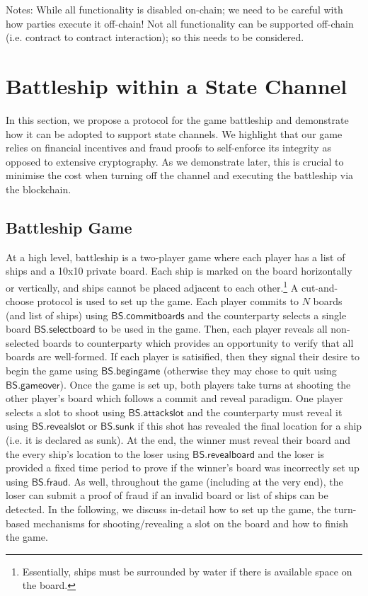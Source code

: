 \documentclass{llncs}
\newcommand{\battleshipfraud}{\mathsf{BS.fraud}}
\newcommand{\battleshipattackslot}{\mathsf{BS.attackslot}}
\newcommand{\battleshipbegin}{\mathsf{BS.begingame}}
\newcommand{\battleshipcommit}{\mathsf{BS.commitboards}}
\newcommand{\battleshipselectboard}{\mathsf{BS.selectboard}}
\newcommand{\battleshiprevealslot}{\mathsf{BS.revealslot}}
\newcommand{\battleshipsinking}{\mathsf{BS.sunk}}
\newcommand{\battleshiprevealboard}{\mathsf{BS.revealboard}}
\newcommand{\battleshipgameover}{\mathsf{BS.gameover}}
\begin{document}
Notes: While all functionality is disabled on-chain; we need to be careful with how parties execute it off-chain! Not all functionality can be supported off-chain (i.e. contract to contract interaction); so this needs to be considered. 

\section{Battleship within a State Channel} 

In this section, we propose a protocol for the game battleship and demonstrate how it can be adopted to support state channels. 
We highlight that our game relies on financial incentives and fraud proofs to self-enforce its integrity as opposed to extensive cryptography.
As we demonstrate later, this is crucial to minimise the cost when turning off the channel and executing the battleship via the blockchain. 

\subsection{Battleship Game} 

At a high level, battleship is a two-player game where each player has a list of ships and a 10x10 private board. 
Each ship is marked on the board horizontally or vertically, and ships cannot be placed adjacent to each other.\footnote{Essentially, ships must be surrounded by water if there is available space on the board.} 
A cut-and-choose protocol is used to set up the game. 
Each player commits to $N$ boards (and list of ships) using $\battleshipcommit$ and the counterparty selects a single board $\battleshipselectboard$ to be used in the game. 
Then, each player reveals all non-selected boards to counterparty which provides an opportunity to verify that all boards are well-formed.
If each player is satisified, then they signal their desire to begin the game using $\battleshipbegin$ (otherwise they may chose to quit using $\battleshipgameover$). 
Once the game is set up, both players take turns at shooting the other player's board which follows a commit and reveal paradigm.
One player selects a slot to shoot using $\battleshipattackslot$ and the counterparty must reveal it using $\battleshiprevealslot$ or $\battleshipsinking$ if this shot has revealed the final location for a ship (i.e. it is declared as sunk). 
At the end, the winner must reveal their board and the every ship's location to the loser  using $\battleshiprevealboard$ and the loser is provided a fixed time period to prove if the winner's board was incorrectly set up using $\battleshipfraud$. 
As well, throughout the game (including at the very end), the loser can submit a proof of fraud if an invalid board or list of ships can be detected. 
In the following, we discuss in-detail how to set up the game, the turn-based mechanisms for shooting/revealing a slot on the board and  how to finish the game. 
\end{document}
